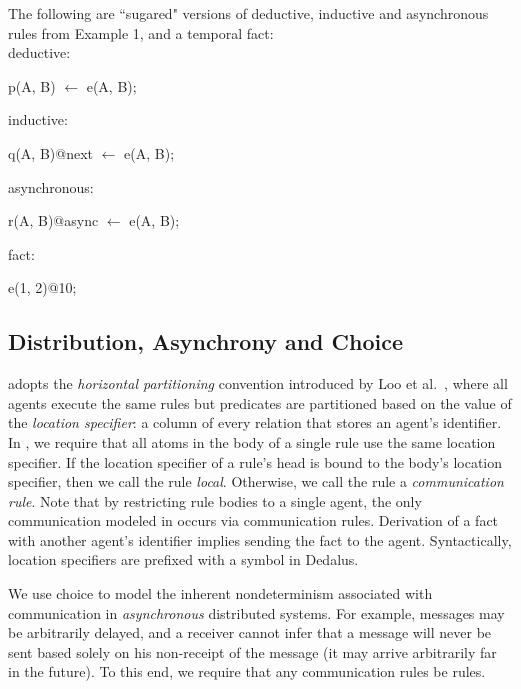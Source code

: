\begin{example}
The following are ``sugared" versions of deductive, inductive and asynchronous rules from Example 1, and a temporal fact:
\\
deductive:
\begin{Dedalus}
p(A, B) \(\leftarrow\) e(A, B);
\end{Dedalus}
inductive:
\begin{Dedalus}
q(A, B)@next \(\leftarrow\) e(A, B);
\end{Dedalus}
asynchronous:
\begin{Dedalus}
r(A, B)@async \(\leftarrow\) e(A, B);
\end{Dedalus}
fact:
\begin{Dedalus}
e(1, 2)@10;
\end{Dedalus}

\end{example}

\subsection{Distribution, Asynchrony and Choice}

\lang adopts the {\em horizontal partitioning} convention introduced by Loo et
al.~\cite{Loo:2005}, where all agents execute the same rules but predicates
are partitioned based on the value of the {\em location specifier}: a column of
every relation that stores an agent's identifier. In \lang, we require that all
atoms in the body of a single rule use the same location specifier. If the location
specifier of a rule's head is bound to the body's location specifier, then we
call the rule {\em local}.  Otherwise, we call the rule a {\em communication rule}.
Note that by restricting rule bodies to a single agent, the only communication
modeled in \lang occurs via communication rules.  Derivation of a fact with
another agent's identifier implies sending the fact to the agent.
Syntactically, location specifiers are prefixed with a \dedalus{\#} symbol in
Dedalus.

We use choice to model the inherent nondeterminism associated with
communication in {\em asynchronous} distributed systems.  For example, messages
may be arbitrarily delayed, and a receiver cannot infer that a message will
never be sent based solely on his non-receipt of the message (it may arrive
arbitrarily far in the future).
To this end, we require that any communication rules be  rules.

